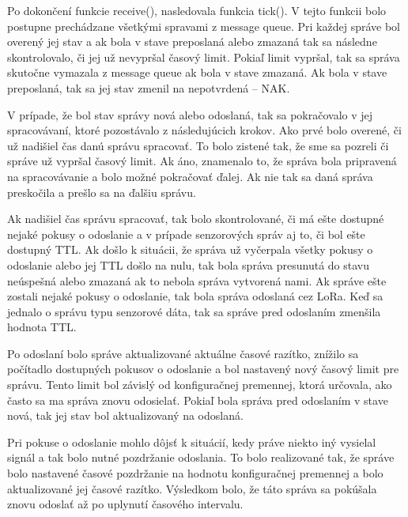 \documentclass[slovak,master]{diploma}
\begin{document}
Po dokončení funkcie receive(), nasledovala funkcia tick(). V tejto funkcii bolo postupne prechádzane všetkými spravami z message queue. Pri každej správe bol overený jej stav 
a ak bola v stave preposlaná alebo zmazaná tak sa následne skontrolovalo, či jej už nevypršal časový limit. Pokiaľ limit vypršal, tak sa správa 
skutočne vymazala z message queue ak bola v stave zmazaná. Ak bola v stave preposlaná, tak sa jej stav zmenil na nepotvrdená -- NAK.

V prípade, že bol stav správy nová alebo odoslaná, tak sa pokračovalo v jej spracovávaní, ktoré pozostávalo z následujúcich krokov.
Ako prvé bolo overené, či už nadišiel čas danú správu spracovať. To bolo zistené tak, že sme sa pozreli či správe už vypršal časový limit. Ak áno, znamenalo to, že správa bola pripravená na spracovávanie 
a bolo možné pokračovať ďalej. Ak nie tak sa daná správa preskočila a prešlo sa na ďalšiu správu.

Ak nadišiel čas správu spracovať, tak bolo skontrolované, či má ešte dostupné nejaké pokusy o odoslanie a v prípade senzorových správ aj to, či bol ešte dostupný TTL.
Ak došlo k situácii, že správa už vyčerpala všetky pokusy o odoslanie alebo jej TTL došlo na nulu, tak bola správa presunutá do stavu neúspešná alebo zmazaná ak to nebola 
správa vytvorená nami. Ak správe ešte zostali nejaké pokusy o odoslanie, tak bola správa odoslaná cez LoRa. Keď sa jednalo o správu typu senzorové dáta, tak sa správe pred 
odoslaním zmenšila hodnota TTL.

Po odoslaní bolo správe aktualizované aktuálne časové razítko, znížilo sa počítadlo dostupných pokusov o odoslanie a bol nastavený nový časový limit pre správu. Tento 
limit bol závislý od konfiguračnej premennej, ktorá určovala, ako často sa ma správa znovu odosielať. Pokiaľ bola správa pred odoslaním v stave nová, tak jej stav bol aktualizovaný 
na odoslaná.

Pri pokuse o odoslanie mohlo dôjsť k situácií, kedy práve niekto iný vysielal signál a tak bolo nutné pozdržanie odoslania. To bolo realizované tak, že správe bolo nastavené 
časové pozdržanie na hodnotu konfiguračnej premennej a bolo aktualizované jej časové razítko. Výsledkom bolo, že táto správa sa pokúšala znovu odoslať až po uplynutí 
časového intervalu.
\end{document}
